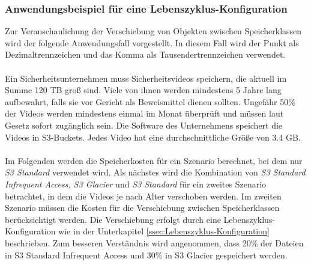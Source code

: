 \subsubsection{Anwendungsbeispiel für eine Lebenszyklus-Konfiguration}\label{Anwendungsbeispiel-Leben-Konfig}
Zur Veranschaulichung der Verschiebung von Objekten zwischen Speicherklassen wird der folgende Anwendungsfall vorgestellt. In diesem Fall wird der Punkt als Dezimaltrennzeichen und das Komma als Tausendertrennzeichen verwendet. 
\\\\
Ein Sicherheitsunternehmen muss Sicherheitsvideos speichern, die aktuell im Summe 120 TB groß sind. Viele von ihnen werden mindestens 5 Jahre lang aufbewahrt, falls sie vor Gericht als Beweismittel dienen sollten. Ungefähr 50\% der Videos werden mindestens einmal im Monat überprüft und müssen laut Gesetz sofort zugänglich sein. Die Software des Unternehmens speichert die Videos in S3-Buckets. Jedes Video hat eine durchschnittliche Größe von 3.4 GB.
\\\\
Im Folgenden werden die Speicherkosten für ein Szenario berechnet, bei dem nur \textit{S3 Standard} verwendet wird. Als nächstes wird die Kombination von \textit{S3 Standard Infrequent Access, S3 Glacier} und \textit{S3 Standard} für ein zweites Szenario betrachtet, in dem die Videos je nach Alter verschoben werden. Im zweiten Szenario müssen die Kosten für die Verschiebung zwischen Speicherklassen berücksichtigt werden. Die Verschiebung erfolgt durch eine Lebenszyklus-Konfiguration wie in der Unterkapitel \ref{ssec:Lebenszyklus-Konfiguration} beschrieben. Zum besseren Verständnis wird angenommen, dass 20\% der Dateien in S3 Standard Infrequent Access und 30\% in S3 Glacier gespeichert werden.
\newpage
